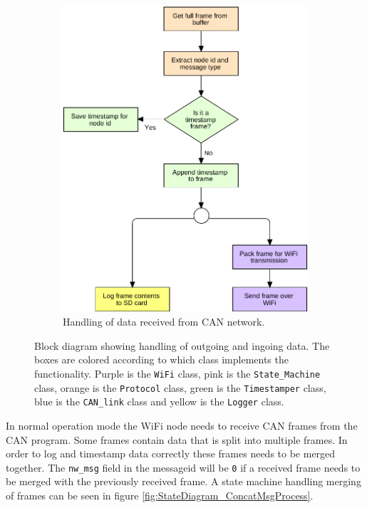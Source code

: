 \begin{figure}[!h]
\begin{subfigure}[b]{0.52\textwidth}
\includegraphics[width=1\textwidth]{graphics/FlowChart_CANFrameProcess}
\caption{Handling of data received from CAN network.}
\label{fig:FlowChart_CANFrameProcess}
\end{subfigure}
\caption{Block diagram showing handling of outgoing and ingoing data. The boxes are colored according to which class implements the functionality. Purple is the \texttt{WiFi} class, pink is the \texttt{State\_Machine} class, orange is the \texttt{Protocol} class, green is the \texttt{Timestamper} class, blue is the \texttt{CAN\_link} class and yellow is the \texttt{Logger} class.}
\label{fig:wifi_flow}
\end{figure}

In normal operation mode the WiFi node needs to receive CAN frames from the CAN program. 
Some frames contain data that is split into multiple frames.
In order to log and timestamp data correctly these frames needs to be merged together.
The \texttt{nw\_msg} field in the messageid will be \texttt{0} if a received frame needs to be merged with the previously received frame.
A state machine handling merging of frames can be seen in figure \ref{fig:StateDiagram_ConcatMsgProcess}.


